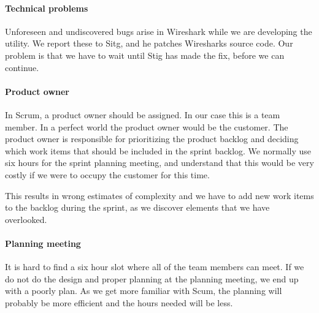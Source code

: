 \paragraph{Technical problems} 
Unforeseen and undiscovered bugs arise in Wireshark while we are developing the utility. We report these to Sitg, and he patches Wiresharks source code. Our problem is that we have to wait until Stig has made the fix, before we can continue.
\paragraph{Product owner}
In Scrum, a product owner should be assigned. In our case this is a team member. In a perfect world the product owner would be the customer. The product owner is responsible for prioritizing the product backlog and deciding which work items that should be included in the sprint backlog. We normally use six hours for the sprint planning meeting, and understand that this would be very costly if we were to occupy the customer for this time.

This results in wrong estimates of complexity and we have to add new work items to the backlog during the sprint, as we discover elements that we have overlooked. 

\paragraph{Planning meeting}
It is hard to find a six hour slot where all of the team members can meet. If we do not do the design and proper planning at the planning meeting, we end up with a poorly plan. As we get more familiar with Scum, the planning will probably be more efficient and the hours needed will be less. 





